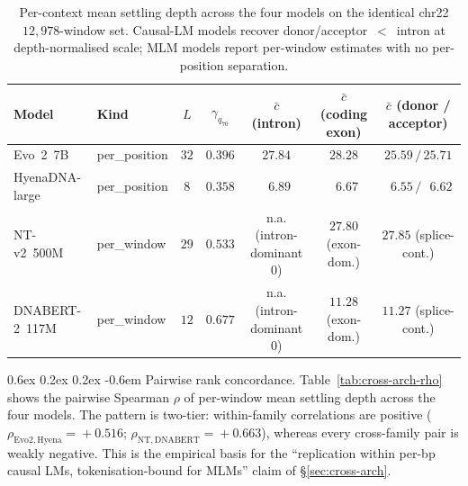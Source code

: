 \documentclass{article}
\makeatletter
\renewcommand\paragraph{\@startsection{paragraph}{4}{\z@}%
  {0.6ex \@plus 0.2ex \@minus 0.2ex}%
  {-0.6em}%
{\normalfont\normalsize\bfseries}}
\theoremstyle{plain}
\theoremstyle{definition}
\theoremstyle{remark}
\makeatother
\begin{document}
\begin{table}[!htbp]
  \caption{Per-context mean settling depth across the four models on the
    identical chr22 $12{,}978$-window set. Causal-LM models recover
    donor/acceptor~$<$~intron at depth-normalised scale; MLM models
  report per-window estimates with no per-position separation.}
  \label{tab:cross-arch-context}
  \centering
  \footnotesize
  \setlength{\tabcolsep}{4pt}
  \begin{tabular}{@{}llccccc@{}}
    \toprule
    Model & Kind & $L$ & $\gamma_{q_{70}}$
    & $\bar c$ (intron) & $\bar c$ (coding exon)
    & $\bar c$ (donor / acceptor) \\
    \midrule
    Evo~2~7B            & per\_position & $32$ & $0.396$
    & $27.84$ & $28.28$ & $25.59 \,/\, 25.71$ \\
    HyenaDNA-large      & per\_position & $8$  & $0.358$
    & $\phantom{0}6.89$ & $\phantom{0}6.67$
    & $\phantom{0}6.55 \,/\, \phantom{0}6.62$ \\
    NT-v2~500M          & per\_window   & $29$ & $0.533$
    & n.a. (intron-dominant 0)
    & $27.80$ (exon-dom.) & $27.85$ (splice-cont.) \\
    DNABERT-2~117M      & per\_window   & $12$ & $0.677$
    & n.a. (intron-dominant 0)
    & $11.28$ (exon-dom.) & $11.27$ (splice-cont.) \\
    \bottomrule
  \end{tabular}
\end{table}

\paragraph{Pairwise rank concordance.} Table~\ref{tab:cross-arch-rho}
shows the pairwise Spearman $\rho$ of per-window mean settling depth
across the four models. The pattern is two-tier: within-family
correlations are positive ($\rho_{\mathrm{Evo2,Hyena}}\!=\!+0.516$;
$\rho_{\mathrm{NT,DNABERT}}\!=\!+0.663$), whereas every cross-family
pair is weakly negative. This is the empirical basis for the
``replication within per-bp causal LMs, tokenisation-bound for MLMs''
claim of \S\ref{sec:cross-arch}.
\end{document}

